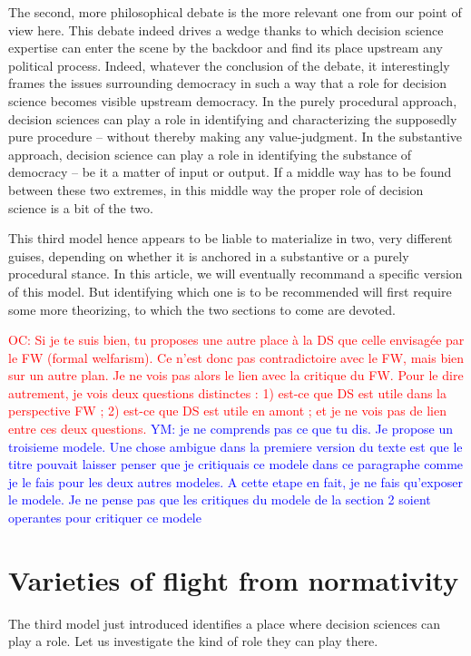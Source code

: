 \documentclass[preprint,11pt]{elsarticle}
\newcommand{\commentYM}[1]{\textcolor{blue}{YM: #1}}
\newcommand{\commentOC}[1]{\textcolor{red}{OC: #1}}
\begin{document}
The second, more philosophical debate is the more relevant one from our point of view here. This debate indeed drives a wedge thanks to which decision science expertise can enter the scene by the backdoor and find its place upstream any political process. Indeed, whatever the conclusion of the debate, it interestingly frames the issues surrounding democracy in such a way that a role for decision science becomes visible upstream democracy. In the purely procedural approach, decision sciences can play a role in identifying and characterizing the supposedly pure procedure -- without thereby making any value-judgment. In the substantive approach, decision science can play a role in identifying the substance of democracy -- be it a matter of input or output. If a middle way has to be found between these two extremes, in this middle way the proper role of decision science is a bit of the two.

This third model hence appears to be liable to materialize in two, very different guises, depending on whether it is anchored in a substantive or a purely procedural stance. In this article, we will eventually recommand a specific version of this model. But identifying which one is to be recommended will first require some more theorizing, to which the two sections to come are devoted. 

\commentOC{Si je te suis bien, tu proposes une
autre place à la DS que celle envisagée par le FW (formal
welfarism). Ce n’est donc pas contradictoire avec le FW, mais
bien sur un autre plan. Je ne vois pas alors le lien avec la
critique du FW.
Pour le dire autrement, je vois deux questions distinctes : 1)
est-ce que DS est utile dans la perspective FW ; 2) est-ce que
DS est utile en amont ; et je ne vois pas de lien entre ces
deux questions.}
\commentYM{je ne comprends pas ce que tu dis. Je propose un troisieme modele. Une chose ambigue dans la premiere version du texte est que le titre pouvait laisser penser que je critiquais ce modele dans ce paragraphe comme je le fais pour les deux autres modeles. A cette etape en fait, je ne fais qu'exposer le modele. Je ne pense pas que les critiques du modele de la section 2 soient operantes pour critiquer ce modele}

\section{Varieties of flight from normativity}
\noindent The third model just introduced identifies a place where decision sciences can play a role. Let us investigate the kind of role they can play there.
\end{document}
